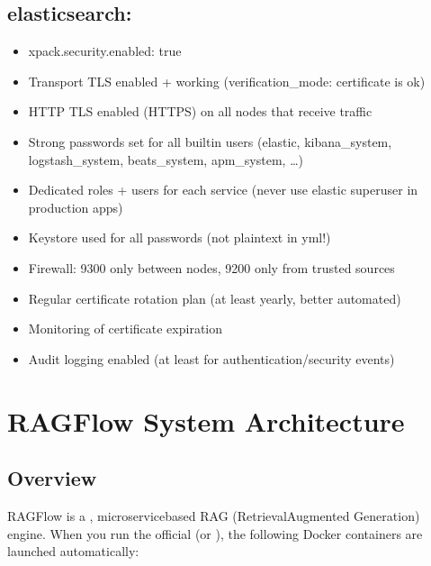 \documentclass[letterpaper,10pt,english]{sphinxmanual}
\begin{document}
\section{elasticsearch:}
\label{\detokenize{security-concerns:elasticsearch}}\begin{itemize}
\item {} 
\sphinxAtStartPar
xpack.security.enabled: true

\item {} 
\sphinxAtStartPar
Transport TLS enabled + working (verification\_mode: certificate is ok)

\item {} 
\sphinxAtStartPar
HTTP TLS enabled (HTTPS) on all nodes that receive traffic

\item {} 
\sphinxAtStartPar
Strong passwords set for all built\sphinxhyphen{}in users (elastic, kibana\_system, logstash\_system, beats\_system, apm\_system, …)

\item {} 
\sphinxAtStartPar
Dedicated roles + users for each service (never use elastic superuser in production apps)

\item {} 
\sphinxAtStartPar
Keystore used for all passwords (not plaintext in yml!)

\item {} 
\sphinxAtStartPar
Firewall: 9300 only between nodes, 9200 only from trusted sources

\item {} 
\sphinxAtStartPar
Regular certificate rotation plan (at least yearly, better automated)

\item {} 
\sphinxAtStartPar
Monitoring of certificate expiration

\item {} 
\sphinxAtStartPar
Audit logging enabled (at least for authentication/security events)

\end{itemize}

\sphinxstepscope


\chapter{RAGFlow System Architecture}
\label{\detokenize{architecture:ragflow-system-architecture}}\label{\detokenize{architecture::doc}}

\section{Overview}
\label{\detokenize{architecture:overview}}
\sphinxAtStartPar
RAGFlow is a , micro\sphinxhyphen{}service\sphinxhyphen{}based RAG (Retrieval\sphinxhyphen{}Augmented Generation) engine.
When you run the official  (or ), the following Docker containers are launched automatically:
\end{document}
